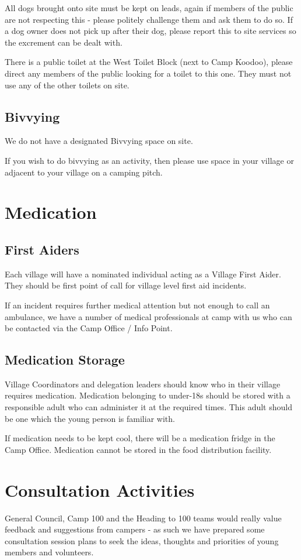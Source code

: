 \documentclass[a4paper, 11pt]{report}
\begin{document}
All dogs brought onto site must be kept on leads, again if members of the public are not respecting this - please politely challenge them and ask them to do so. If a dog owner does not pick up after their dog, please report this to site services so the excrement can be dealt with. \nl

There is a public toilet at the West Toilet Block (next to Camp Koodoo), please direct any members of the public looking for a toilet to this one. They must not use any of the other toilets on site.

\section{Bivvying}
We do not have a designated Bivvying space on site.\nl

If you wish to do bivvying as an activity, then please use space in your village or adjacent to your village on a camping pitch.

\chapter{Medication}
\section{First Aiders}
Each village will have a nominated individual acting as a Village First Aider. They should be first point of call for village level first aid incidents.\nl

If an incident requires further medical attention but not enough to call an ambulance, we have a number of medical professionals at camp with us who can be contacted via the Camp Office / Info Point.

\section{Medication Storage}
Village Coordinators and delegation leaders should know who in their village requires medication. Medication belonging to under-18s should be stored with a responsible adult who can administer it at the required times. This adult should be one which the young person is familiar with.\nl

If medication needs to be kept cool, there will be a medication fridge in the Camp Office. Medication cannot be stored in the food distribution facility. 

\chapter{Consultation Activities}
General Council, Camp 100 and the Heading to 100 teams would really value feedback and suggestions from campers - as such we have prepared some consultation session plans to seek the ideas, thoughts and priorities of young members and volunteers.\nl
\end{document}
